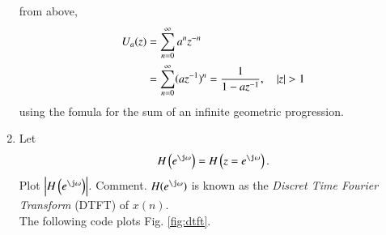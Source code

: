 \documentclass[journal,12pt,twocolumn]{IEEEtran}
\renewcommand\thesection{\arabic{section}}
\begin{document}
\begin{enumerate}[label=\thesection.\arabic*,ref=\thesection.\theenumi]
from above, 
\begin{align}
U_a(z) &= \sum _{n= 0}^{\infty}a^nz^{-n}\\
&= \sum _{n= 0}^{\infty}(az^{-1})^n = \frac{1}{1-az^{-1}}, \quad \left\vert z\right\vert > 1
\end{align}
using the fomula for the sum of an infinite geometric progression.\\


\item 
Let
\begin{equation}
H\brak{e^{\j \omega}} = H\brak{z = e^{\j \omega}}.
\end{equation}
Plot $\abs{H\brak{e^{\j \omega}}}$.  Comment.  $H(e^{\j \omega})$ is
known as the {\em Discret Time Fourier Transform} (DTFT) of $x(n)$.
\\
\solution The following code plots Fig. \ref{fig:dtft}.\\


\end{enumerate}
\end{document}
